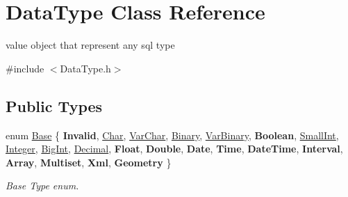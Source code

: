 \hypertarget{class_data_type}{}\section{Data\+Type Class Reference}
\label{class_data_type}


value object that represent any sql type  




{\ttfamily \#include $<$Data\+Type.\+h$>$}

\subsection*{Public Types}
\begin{DoxyCompactItemize}
\item 
enum \hyperlink{class_data_type_a8df455d8d3949b604fbb2967dfeff239}{Base} \{ \newline
{\bfseries Invalid}, 
\hyperlink{class_data_type_a8df455d8d3949b604fbb2967dfeff239a396f5ae6a2286ec8121a2146207850a5}{Char}, 
\hyperlink{class_data_type_a8df455d8d3949b604fbb2967dfeff239a160c768176611f2649889e252c756539}{Var\+Char}, 
\hyperlink{class_data_type_a8df455d8d3949b604fbb2967dfeff239ab4b13294ee3efac7e4831c55caa11022}{Binary}, 
\newline
\hyperlink{class_data_type_a8df455d8d3949b604fbb2967dfeff239a89f767813407ed2a706e8e8f69402667}{Var\+Binary}, 
{\bfseries Boolean}, 
\hyperlink{class_data_type_a8df455d8d3949b604fbb2967dfeff239a8d0497c1a18d35863fb81315b6d0bf41}{Small\+Int}, 
\hyperlink{class_data_type_a8df455d8d3949b604fbb2967dfeff239a3749547ad6302148b455bb3c0855689b}{Integer}, 
\newline
\hyperlink{class_data_type_a8df455d8d3949b604fbb2967dfeff239a4c9dd8d283c3f139832ae29d868fd79c}{Big\+Int}, 
\hyperlink{class_data_type_a8df455d8d3949b604fbb2967dfeff239a0e7950ea81022df1b093fd76fc773bcb}{Decimal}, 
{\bfseries Float}, 
{\bfseries Double}, 
\newline
{\bfseries Date}, 
{\bfseries Time}, 
{\bfseries Date\+Time}, 
{\bfseries Interval}, 
\newline
{\bfseries Array}, 
{\bfseries Multiset}, 
{\bfseries Xml}, 
{\bfseries Geometry}
 \}\begin{DoxyCompactList}\small\item\em Base Type enum. \end{DoxyCompactList}
\end{DoxyCompactItemize}
